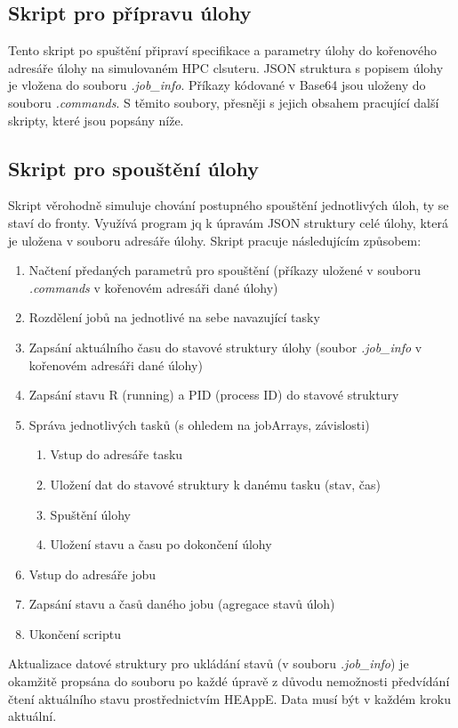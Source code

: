 \subsection{Skript pro přípravu úlohy}
Tento skript po spuštění připraví specifikace a parametry úlohy do kořenového adresáře úlohy na simulovaném HPC clsuteru. JSON struktura s popisem úlohy je vložena do souboru \emph{.job\_info}. Příkazy kódované v Base64 jsou uloženy do souboru \emph{.commands}. S těmito soubory, přesněji s jejich obsahem pracující další skripty, které jsou popsány níže.


\subsection{Skript pro spouštění úlohy}
Skript věrohodně simuluje chování postupného spouštění jednotlivých úloh, ty se staví do fronty. Využívá program jq k úpravám JSON struktury celé úlohy, která je uložena v souboru adresáře úlohy. Skript pracuje následujícím způsobem:

\begin{enumerate}
	\item Načtení předaných parametrů pro spouštění (příkazy uložené v souboru \emph{.commands} v kořenovém adresáři dané úlohy)
	\item Rozdělení jobů na jednotlivé na sebe navazující tasky
	\item Zapsání aktuálního času do stavové struktury úlohy (soubor \emph{.job\_info} v kořenovém adresáři dané úlohy)
	\item Zapsání stavu R (running) a PID (process ID) do stavové struktury
	\item Správa jednotlivých tasků (s ohledem na jobArrays, závislosti)
	\begin{enumerate}
		\item Vstup do adresáře tasku
		\item Uložení dat do stavové struktury k danému tasku (stav, čas)
		\item Spuštění úlohy
		\item Uložení stavu a času po dokončení úlohy
	\end{enumerate}
	\item Vstup do adresáře jobu
	\item Zapsání stavu a časů daného jobu (agregace stavů úloh)
	\item Ukončení scriptu
\end{enumerate}

Aktualizace datové struktury pro ukládání stavů (v souboru \emph{.job\_info}) je okamžitě propsána do souboru po každé úpravě z důvodu nemožnosti předvídání čtení aktuálního stavu prostřednictvím HEAppE. Data musí být v každém kroku aktuální.

